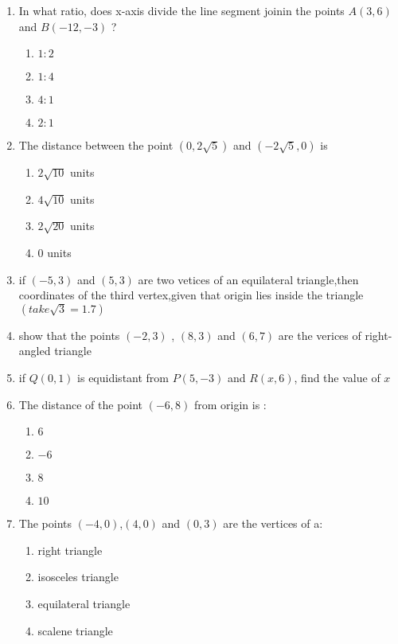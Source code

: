 \begin{enumerate}
\item In what ratio, does x-axis divide the line segment joinin the points $A(3,6)$ and $B(-12, -3)$ ?
\begin{enumerate}
\item $1:2$
\item $1:4$
\item $4:1$ 
\item $2:1$
\end{enumerate}
\item The distance between the point $(0,2\sqrt{5})$ and $(-2\sqrt{5},0)$ is 
\begin{enumerate}
\item $2\sqrt{10}$ units
\item $4\sqrt{10}$ units
\item $2\sqrt{20}$ units
\item $0$ units
\end{enumerate}
\item if $(-5,3)$ and $(5,3)$ are two vetices of an equilateral triangle,then coordinates of the third vertex,given that origin lies inside the triangle $(take \sqrt{3}=1.7)$
\item show that the points $(-2,3)$ , $(8,3)$ and $(6,7)$ are the verices of right-angled triangle
\item if $Q(0,1)$ is equidistant from $P(5,-3)$ and $R(x,6)$, find the value of $x$
\item The distance of the point $(-6,8)$ from origin is :
\begin{enumerate}
\item $6$
\item $-6$
\item $8$
\item $10$
\end{enumerate}
\item The points $(-4,0)$,$(4,0)$ and $(0,3)$ are the vertices of a:
\begin{enumerate}
\item right triangle
\item isosceles triangle
\item equilateral triangle
\item scalene triangle
\end{enumerate}
\end{enumerate}
